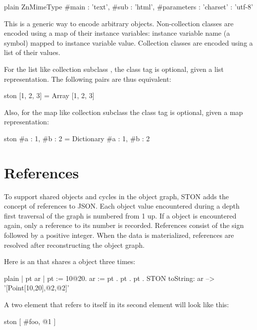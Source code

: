 \documentclass[10pt,twoside,english]{_support/latex/sbabook/sbabook}
\begin{document}
\begin{displaycode}{plain}
ZnMimeType {
   #main : 'text',
   #sub : 'html',
   #parameters : {
      'charset' : 'utf-8'
   }
}
\end{displaycode}

This is a generic way to encode arbitrary objects.
Non-collection classes are encoded using a map of their instance variables: instance variable name (a
symbol) mapped to instance variable value.
Collection classes are encoded using a list of their values.

For the list like collection subclass , the class tag is optional, given a list representation. The following pairs are thus equivalent:

\begin{displaycode}{ston}
[1, 2, 3]  =  Array [1, 2, 3]
\end{displaycode}

Also, for the map like collection subclass  the class tag is optional, given a map representation:

\begin{displaycode}{ston}
{#a : 1, #b : 2} = Dictionary {#a : 1, #b : 2}
\end{displaycode}
\section{References}
To support shared objects and cycles in the object graph, STON adds the concept of references to JSON.
Each object value encountered during a depth first traversal of the graph is numbered from 1 up.
If a object is encountered again, only a reference to its number is recorded.
References consist of the  sign followed by a positive integer.
When the data is materialized, references are resolved after reconstructing the object graph.

Here is an  that shares a  object three times:

\begin{displaycode}{plain}
| pt ar |
pt := 10@20.
ar := { pt . pt . pt }.
STON toString: ar
   --> '[Point[10,20],@2,@2]'
\end{displaycode}

A two element  that refers to itself in its second element will look like this:

\begin{displaycode}{ston}
[ #foo, @1 ]
\end{displaycode}
\end{document}
